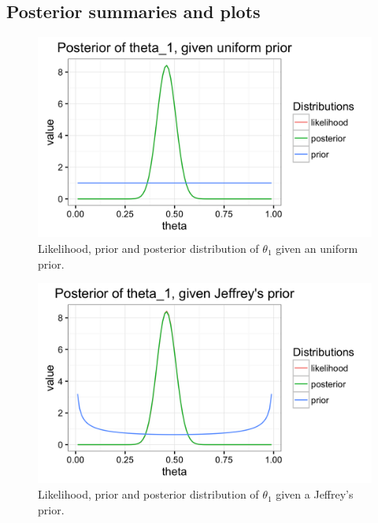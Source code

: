 \documentclass{article}
\begin{document}
\subsection{Posterior summaries and plots}
\begin{figure}[ht!]
    \centering
    \includegraphics[scale=.18]{11_Assignment1/theta1_c1_posterior.png}
    \caption{Likelihood, prior and posterior distribution of $\theta_1$ given an uniform prior.}
    \label{fig:fig2}
\end{figure}

\begin{figure}[ht!]
    \centering
    \includegraphics[scale=.18]{11_Assignment1/theta1_c2_posterior.png}
    \caption{Likelihood, prior and posterior distribution of $\theta_1$ given a Jeffrey's prior.}
    \label{fig:fig3}
\end{figure}
\end{document}
